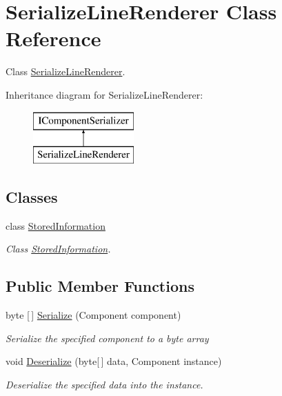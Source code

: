 \hypertarget{class_serialize_line_renderer}{}\section{Serialize\+Line\+Renderer Class Reference}
\label{class_serialize_line_renderer}


Class \hyperlink{class_serialize_line_renderer}{Serialize\+Line\+Renderer}.  


Inheritance diagram for Serialize\+Line\+Renderer\+:\begin{figure}[H]
\begin{center}
\leavevmode
\includegraphics[height=2.000000cm]{class_serialize_line_renderer}
\end{center}
\end{figure}
\subsection*{Classes}
\begin{DoxyCompactItemize}
\item 
class \hyperlink{class_serialize_line_renderer_1_1_stored_information}{Stored\+Information}
\begin{DoxyCompactList}\small\item\em Class \hyperlink{class_serialize_line_renderer_1_1_stored_information}{Stored\+Information}. \end{DoxyCompactList}\end{DoxyCompactItemize}
\subsection*{Public Member Functions}
\begin{DoxyCompactItemize}
\item 
byte \mbox{[}$\,$\mbox{]} \hyperlink{class_serialize_line_renderer_a2e58af3caf73c033912f59f8a568f6e4}{Serialize} (Component component)
\begin{DoxyCompactList}\small\item\em Serialize the specified component to a byte array \end{DoxyCompactList}\item 
void \hyperlink{class_serialize_line_renderer_ae925ea66d21c259c560d2cbe5ccb762b}{Deserialize} (byte\mbox{[}$\,$\mbox{]} data, Component instance)
\begin{DoxyCompactList}\small\item\em Deserialize the specified data into the instance. \end{DoxyCompactList}\end{DoxyCompactItemize}
